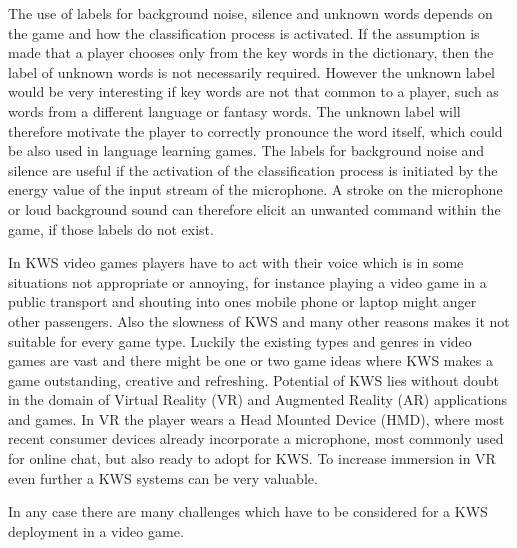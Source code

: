 The use of labels for background noise, silence and unknown words depends on the game and how the classification process is activated.
If the assumption is made that a player chooses only from the key words in the dictionary, then the label of unknown words is not necessarily required.
However the unknown label would be very interesting if key words are not that common to a player, such as words from a different language or fantasy words.
The unknown label will therefore motivate the player to correctly pronounce the word itself, which could be also used in language learning games.
The labels for background noise and silence are useful if the activation of the classification process is initiated by the energy value of the input stream of the microphone.
A stroke on the microphone or loud background sound can therefore elicit an unwanted command within the game, if those labels do not exist.

In KWS video games players have to act with their voice which is in some situations not appropriate or annoying, for instance playing a video game in a public transport and shouting into ones mobile phone or laptop might anger other passengers.
Also the slowness of KWS and many other reasons makes it not suitable for every game type.
Luckily the existing types and genres in video games are vast and there might be one or two game ideas where KWS makes a game outstanding, creative and refreshing.
Potential of KWS lies without doubt in the domain of Virtual Reality (VR) and Augmented Reality (AR) applications and games.
In VR the player wears a Head Mounted Device (HMD), where most recent consumer devices already incorporate a microphone, most commonly used for online chat, but also ready to adopt for KWS.
To increase immersion in VR even further a KWS systems can be very valuable.

In any case there are many challenges which have to be considered for a KWS deployment in a video game.